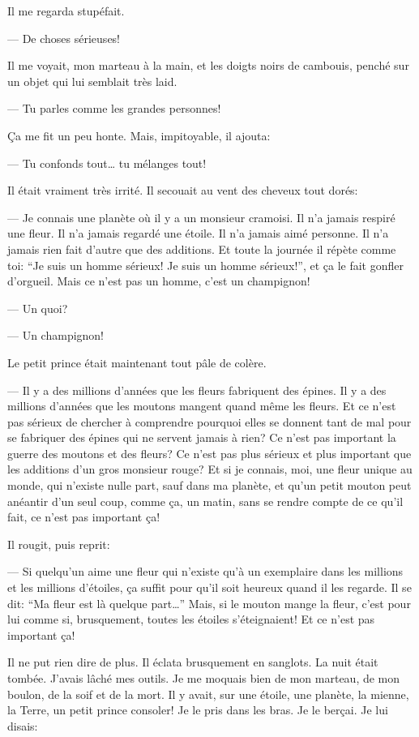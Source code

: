 \begin{Parallel}[p]{}{}
{Il me regarda stupéfait.

--- De choses sérieuses!

Il me voyait, mon marteau à la main, et les doigts
noirs de cambouis, penché sur un objet qui lui semblait très laid.

--- Tu parles comme les grandes personnes!

Ça me fit un peu honte. Mais, impitoyable, il ajouta:

--- Tu confonds tout\ldots{} tu mélanges tout!

Il était vraiment très irrité. Il secouait au vent des
cheveux tout dorés:

--- Je connais une planète où il y a un monsieur cramoisi. Il n'a jamais respiré une fleur. Il n'a jamais
regardé une étoile. Il n'a jamais aimé personne. Il
n'a jamais rien fait d'autre que des additions. Et
toute la journée il répète comme toi: ``Je suis un
homme sérieux! Je suis un homme sérieux!'', et ça
le fait gonfler d'orgueil. Mais ce n'est pas un
homme, c'est un champignon!

--- Un quoi?

--- Un champignon!

Le petit prince était maintenant tout pâle de colère.

--- Il y a des millions d'années que les fleurs fabriquent des
épines. Il y a des millions d'années que les moutons mangent
quand même les fleurs. Et ce n'est pas sérieux de chercher à
comprendre pourquoi elles se
donnent tant de mal pour se
fabriquer des épines qui ne servent jamais à rien? Ce n'est pas
important la guerre des moutons et des fleurs? Ce n'est pas
plus sérieux et plus important que les additions d'un gros
monsieur rouge? Et si je connais, moi, une fleur unique
au monde, qui n'existe nulle part, sauf dans ma planète,
et qu'un petit mouton peut anéantir d'un seul coup, comme ça, un matin, sans
se rendre compte de ce qu'il fait, ce n'est pas important ça!

Il rougit, puis reprit:

--- Si quelqu'un aime une fleur qui n'existe qu'à un
exemplaire dans les millions et les millions d'étoiles,
ça suffit pour qu'il soit heureux quand il les
regarde. Il se dit: ``Ma fleur est là quelque part\ldots{}''
Mais, si le mouton mange la fleur, c'est pour lui
comme si, brusquement, toutes les étoiles s'éteignaient! Et ce n'est pas important ça!

Il ne put rien dire de plus. Il éclata brusquement
en sanglots. La nuit était tombée. J'avais lâché mes
outils. Je me moquais bien de mon marteau, de mon
boulon, de la soif et de la mort. Il y avait, sur une
étoile, une planète, la mienne, la Terre, un petit
prince consoler! Je le pris dans les bras. Je le berçai. Je lui disais:

}
\end{Parallel}
